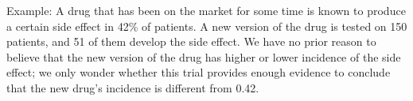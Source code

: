 \documentclass[11pt,letterpaper,twoside]{article}
\begin{document}
Example: A drug that has been on the market for some time is known to produce a certain side effect in 42\% of patients. A new version of the drug is tested on 150 patients, and 51 of them develop the side effect.
We have no prior reason to believe that the new version of the drug has higher or lower incidence of the side effect; we only wonder whether this trial provides enough evidence to conclude that the new drug's incidence is different from 0.42.







\label{totalpag}
\end{document}

